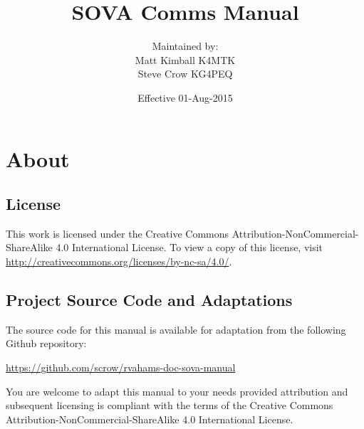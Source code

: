\documentclass[pdflatex,letterpaper,twoside,12pt]{book}
\title             {SOVA Comms Manual}
\author            {Maintained by:\\Matt Kimball K4MTK\\Steve Crow KG4PEQ}
\date              {Effective 01-Aug-2015}
\begin{document}
\rvahTitlePage
\skipToTOC
\rvahTOC


\chapter{About}

\section{License}

This work is licensed under the Creative Commons Attribution-NonCommercial-ShareAlike 4.0 International License. To view a copy of this license, visit\\
\href{http://creativecommons.org/licenses/by-nc-sa/4.0/}{http://creativecommons.org/licenses/by-nc-sa/4.0/}.

\section{Project Source Code and Adaptations}

The source code for this manual is available for adaptation from the following Github repository:

\href{https://github.com/scrow/rvahams-doc-sova-manual}{https://github.com/scrow/rvahams-doc-sova-manual}

You are welcome to adapt this manual to your needs provided attribution and subsequent licensing is compliant with the terms of the Creative Commons Attribution-NonCommercial-ShareAlike 4.0 International License.

\end{document}

